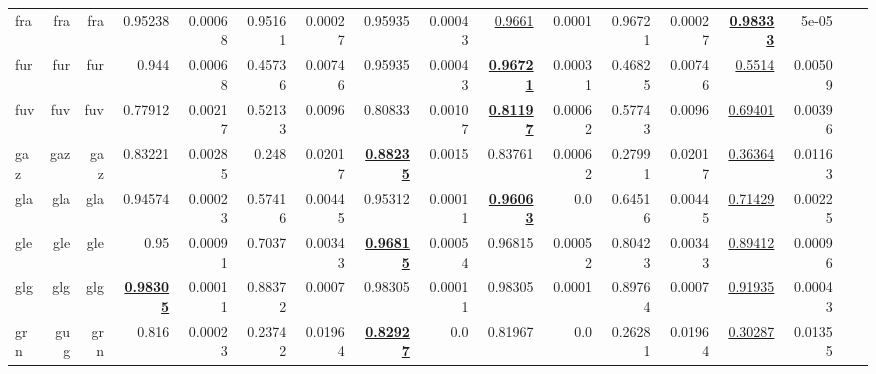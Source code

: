 \documentclass[11pt]{article}
\begin{document}
\begin{table*}[h]
{\begin{tabular}{lrrrrrrrrrrrrrrrr}
fra         & fra         & fra         & 0.95238         & 0.00068         & 0.95161         & 0.00027         & 0.95935         & 0.00043         & \underline{0.9661}         & 0.0001         & 0.96721         & 0.00027         & \textbf{\underline{0.98333}}         & 5e-05         \\
fur         & fur         & fur         & 0.944         & 0.00068         & 0.45736         & 0.00746         & 0.95935         & 0.00043         & \textbf{\underline{0.96721}}         & 0.00031         & 0.46825         & 0.00746         & \underline{0.5514}         & 0.00509         \\
fuv         & fuv         & fuv         & 0.77912         & 0.00217         & 0.52133         & 0.0096         & 0.80833         & 0.00107         & \textbf{\underline{0.81197}}         & 0.00062         & 0.57743         & 0.0096         & \underline{0.69401}         & 0.00396         \\
gaz         & gaz         & gaz         & 0.83221         & 0.00285         & 0.248         & 0.02017         & \textbf{\underline{0.88235}}         & 0.0015         & 0.83761         & 0.00062         & 0.27991         & 0.02017         & \underline{0.36364}         & 0.01163         \\
gla         & gla         & gla         & 0.94574         & 0.00023         & 0.57416         & 0.00445         & 0.95312         & 0.00011         & \textbf{\underline{0.96063}}         & 0.0         & 0.64516         & 0.00445         & \underline{0.71429}         & 0.00225         \\
gle         & gle         & gle         & 0.95         & 0.00091         & 0.7037         & 0.00343         & \textbf{\underline{0.96815}}         & 0.00054         & 0.96815         & 0.00052         & 0.80423         & 0.00343         & \underline{0.89412}         & 0.00096         \\
glg         & glg         & glg         & \textbf{\underline{0.98305}}         & 0.00011         & 0.88372         & 0.0007         & 0.98305         & 0.00011         & 0.98305         & 0.0001         & 0.89764         & 0.0007         & \underline{0.91935}         & 0.00043         \\
grn         & gug         & grn         & 0.816         & 0.00023         & 0.23742         & 0.01964         & \textbf{\underline{0.82927}}         & 0.0         & 0.81967         & 0.0         & 0.26281         & 0.01964         & \underline{0.30287}         & 0.01355         \\

\end{tabular}}
\end{table*}
\end{document}
